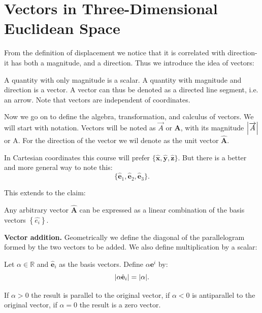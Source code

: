 \documentclass[10pt]{article}
\begin{document}
	\section{Vectors in Three-Dimensional Euclidean Space}
	From the definition of displacement we notice that it is correlated with direction- it has both a magnitude, and a direction. Thus we introduce the idea of vectors:
	\begin{definition}
		A quantity with only magnitude is a scalar. A quantity with magnitude and direction is a vector. A vector can thus be denoted as a directed line segment, i.e. an arrow. Note that vectors are independent of coordinates.
	\end{definition}

	Now we go on to define the algebra, transformation, and calculus of vectors. We will start with notation. Vectors will be noted as $\overrightarrow{A}$ or $\mathbf{A}$, with its magnitude $\vqty{\overrightarrow{A}}$ or $\mathrm{A}$. For the direction of the vector we wil denote as the unit vector $\mathbf{\hat{A}}$.

	\vspace{1\baselineskip}
	In Cartesian coordinates this course will prefer $\{\hat{\mathbf{x}}, \hat{\mathbf{y}}, \hat{\mathbf{z}}\}$. But there is a better and more general way to note this:
	\begin{equation}
	  \{\hat{\mathbf{e}}_1,\hat{\mathbf{e}}_2,\hat{\mathbf{e}}_3\}.
	\end{equation}

	This extends to the claim:
	\begin{claim}
		Any arbitrary vector $\hat{\mathbf{A}}$ can be expressed as a linear combination of the basis vectors $\left\{ \hat{e_{i}} \right\} $.
	\end{claim}

	\vspace{1\baselineskip}
	\textbf{Vector addition.} Geometrically we define the diagonal of the parallelogram formed by the two vectors to be added. We also define multiplication by a scalar:
	\begin{definition}
	  Let $\alpha \in \mathbb{R}$ and $\hat{\mathbf{e}}_{i}$ as the basis vectors. Define $\alpha \mathbf{e}^{i}$ by:
	  \begin{equation}
		\vqty{\alpha \hat{\mathbf{e}}_{i}} = \vqty{\alpha}.
	  \end{equation}

	  If $\alpha>0$ the result is parallel to the original vector, if $\alpha<0$ is antiparallel to the original vector, if $\alpha=0$ the result is a zero vector.
	\end{definition}
	
\end{document}
